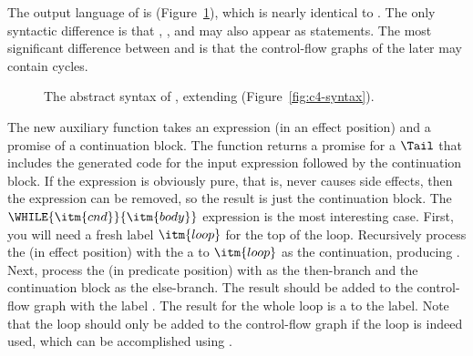 \documentclass[11pt]{book}
\newcommand{\gray}[1]{{\color{gray} #1}}
\begin{document}
The output language of  is \LangCLoop{}
(Figure~\ref{fig:c7-syntax}), which is nearly identical to
\LangCLam{}. The only syntactic difference is that ,
, and  may also appear as statements.
The most significant difference between \LangCLam{} and \LangCLoop{}
is that the control-flow graphs of the later may contain cycles.


\begin{figure}[tp]
\fbox{
\begin{minipage}{0.96\textwidth}
\small
\[
\begin{array}{lcl}
\Stmt &::=& \gray{ \ASSIGN{\VAR{\Var}}{\Exp} 
       \mid \LP\key{Collect} \,\itm{int}\RP } \\
     &\mid& \CALL{\Atm}{\LP\Atm\ldots\RP} \mid \READ{}\\
     &\mid& \LP\key{Prim}~\key{'vector-set!}\,\LP\key{list}\,\Atm\,\INT{\Int}\,\Atm\RP\RP \\
\Def &::=& \DEF{\itm{label}}{\LP\LS\Var\key{:}\Type\RS\ldots\RP}{\Type}{\itm{info}}{\LP\LP\itm{label}\,\key{.}\,\Tail\RP\ldots\RP}\\
\LangCLoop{} & ::= & \PROGRAMDEFS{\itm{info}}{\LP\Def\ldots\RP} 
\end{array}
\]
\end{minipage}
}
\caption{The abstract syntax of \LangCLoop{}, extending \LangCLam{} (Figure~\ref{fig:c4-syntax}).}
\label{fig:c7-syntax}
\end{figure}

The new auxiliary function  takes an expression
(in an effect position) and a promise of a continuation block. The
function returns a promise for a $\Tail$ that includes the generated
code for the input expression followed by the continuation block.  If
the expression is obviously pure, that is, never causes side effects,
then the expression can be removed, so the result is just the
continuation block.
%
The $\WHILE{\itm{cnd}}{\itm{body}}$ expression is the most interesting
case.  First, you will need a fresh label $\itm{loop}$ for the top of
the loop.  Recursively process the  (in effect position)
with the a  to $\itm{loop}$ as the continuation, producing
. Next, process the  (in predicate position) with
 as the then-branch and the continuation block as the
else-branch. The result should be added to the control-flow graph with
the label . The result for the whole  loop is a
 to the  label. Note that the loop should only be
added to the control-flow graph if the loop is indeed used, which can
be accomplished using .
\end{document}
